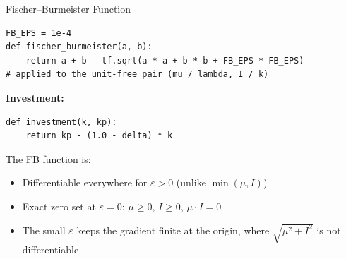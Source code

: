 \documentclass[aspectratio=169,11pt]{beamer}
\newcommand{\emphc}[1]{\textcolor{harvardcrimson}{#1}}
\begin{document}
% 
% 
% 

\begin{frame}[fragile]{Fischer--Burmeister Function}
\begin{lstlisting}
FB_EPS = 1e-4
def fischer_burmeister(a, b):
    return a + b - tf.sqrt(a * a + b * b + FB_EPS * FB_EPS)
# applied to the unit-free pair (mu / lambda, I / k)
\end{lstlisting}

\vspace{0.3em}
\textbf{Investment:}
\begin{lstlisting}
def investment(k, kp):
    return kp - (1.0 - delta) * k
\end{lstlisting}

\vspace{0.3em}
The FB function is:
\begin{itemize}
    \item \emphc{Differentiable} everywhere for $\varepsilon>0$ (unlike $\min(\mu, I)$)
    \item \emphc{Exact zero set} at $\varepsilon=0$: $\mu \geq 0$, $I \geq 0$, $\mu \cdot I = 0$
    \item The small $\varepsilon$ keeps the gradient finite at the origin, where $\sqrt{\mu^2 + I^2}$ is not differentiable
\end{itemize}
\end{frame}
\end{document}
